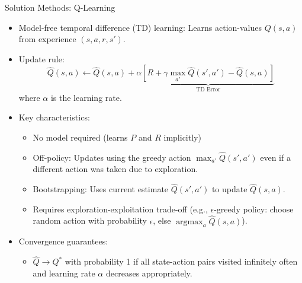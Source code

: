 \documentclass[10pt]{beamer}
\DeclareMathOperator*{\maxop}{max} %
\DeclareMathOperator*{\argmax}{argmax} %
\begin{document}
\begin{frame}{Solution Methods: Q-Learning}
    \begin{itemize}
        \item Model-free temporal difference (TD) learning: Learns action-values $Q(s,a)$ from experience $(s,a,r,s')$.
        \item Update rule:
        \begin{equation}
            \hat{Q}(s,a) \leftarrow \hat{Q}(s,a) + \alpha \underbrace{\left[ R + \gamma \maxop_{a'} \hat{Q}(s',a') - \hat{Q}(s,a) \right]}_{\text{TD Error}}
        \end{equation}
         where $\alpha$ is the learning rate.

        \item Key characteristics:
        \begin{itemize}
            \item No model required (learns $P$ and $R$ implicitly)
            \item Off-policy: Updates using the greedy action $\maxop_{a'} \hat{Q}(s',a')$ even if a different action was taken due to exploration.
            \item Bootstrapping: Uses current estimate $\hat{Q}(s',a')$ to update $\hat{Q}(s,a)$.
            \item Requires exploration-exploitation trade-off (e.g., $\epsilon$-greedy policy: choose random action with probability $\epsilon$, else $\argmax_a \hat{Q}(s,a)$).
        \end{itemize}

        \item Convergence guarantees:
        \begin{itemize}
            \item $\hat{Q} \to Q^*$ with probability 1 if all state-action pairs visited infinitely often and learning rate $\alpha$ decreases appropriately.
        \end{itemize}
    \end{itemize}
\end{frame}

\end{document}
